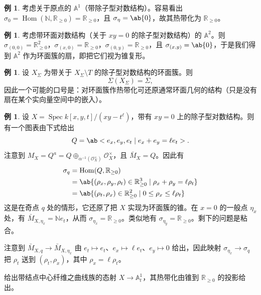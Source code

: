 \documentclass{amsart}
\theoremstyle{definition}
\newtheorem{exm}[thm]{例}
\theoremstyle{remark}
\theoremstyle{plain}
\theoremstyle{definition}
\theoremstyle{remark}
\newcommand{\A}{\mathbb{A}}
\newcommand{\N}{\mathbb{N}}
\newcommand{\R}{\mathbb{R}}
\newcommand{\mc}[1]{\mathcal{#1}}
\newcommand{\1}{\mathbf{1}}
\newcommand{\2}{\mathbf{2}}
\newcommand{\3}{\mathbf{3}}
\DeclareMathOperator{\Hom}{Hom}
\DeclareMathOperator{\Spec}{Spec}
\begin{document}
\begin{exm}
    考虑关于原点的 \(\A^1\)（带除子型对数结构）。容易看出 \(\sigma_0 = \Hom(\N, \R_{\geq 0}) = \R_{\geq 0}\)，且 \(\sigma_{\eta} = \ab\{0\}\)，故其热带化为 \(\R_{\geq 0}\)。
\end{exm}

\begin{exm}
    考虑带环面对数结构（关于 \(xy = 0\) 的除子型对数结构）的 \(\A^2\)。则 \(\sigma_{(0,0)} = \R^2_{\geq 0}\)，\(\sigma_{(x,0)} = \R_{\geq 0}\)，\(\sigma_{(0,y)} = \R_{\geq 0}\)，且 \(\sigma_{(x,y)} = \ab\{0\}\)，于是我们得到 \(\A^2\) 作为环面簇的扇，即把它们视为锥复形。
\end{exm}

\begin{exm}
    设 \(X_{\Sigma}\) 为带关于 \(X_{\Sigma} \setminus T\) 的除子型对数结构的环面簇。则
    \[ \Sigma(X_{\Sigma}) = \Sigma, \]
    因此一个可能的口号是：对环面簇作热带化可还原通常环面几何的结构（只是没有扇在某个实向量空间中的嵌入）。
\end{exm}

\begin{exm}
    设 \(X = \Spec k[x,y,t]/(xy-t^{\ell})\)，带有 \(xy = 0\) 上的除子型对数结构。则有一个图表由下式给出
    \[ Q = \ab<e_x, e_y, e_t \mid e_x + e_y = \ell e_t>. \]
    注意到 \(M_X = Q^a = Q \oplus_{\alpha^{-1}(\mc{O}_X^{\times})} \mc{O}_X^{\times}\)，且 \(\bar{M}_X = Q\)。因此有
    \begin{align*}
        \sigma_q &= \Hom(Q, \R_{\geq 0}) \\
        &= \ab\{ (\rho_x, \rho_y, \rho_t) \in \R_{\geq 0}^3 \mid \rho_x + \rho_y = \ell \rho_t \} \\
        &= \ab\{ (\rho_t, \rho_x) \in \R_{\geq 0}^2 \mid 0 \leq \rho_x \leq \ell \rho_t \}
    \end{align*}
    这是在奇点 \(q\) 处的情形，它还原了把 \(X\) 实现为环面簇的锥。在 \(x = 0\) 的一般点 \(\eta_x\) 处，有 \(\bar{M}_{X, \eta_x} = \N e_t\)，从而 \(\sigma_{\eta_x} = \R_{\geq 0}\)。类似地有 \(\sigma_{\eta_y} = \R_{\geq 0}\)。剩下的问题是粘合。 

    注意到 \(\bar{M}_{X, q} \to \bar{M}_{X, \eta_x}\) 由 \(e_t \mapsto e_t\)、\(e_x \mapsto \ell e_t\)、\(e_y \mapsto 0\) 给出，因此映射 \(\sigma_{\eta_x} \to \sigma_q\) 把 \(\rho_t\) 送到 \((\rho_t, \rho_x)\)，其中 \(\rho_x = \ell \rho_t\)。

    给出带结点中心纤维之曲线族的态射 \(X \to \A^1_t\)，其热带化由锥到 \(\R_{\geq 0}\) 的投影给出。
\end{exm}
\end{document}
